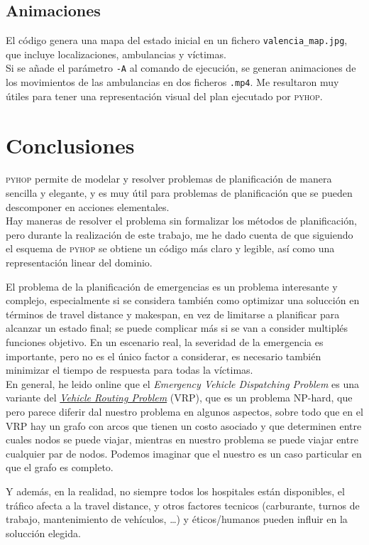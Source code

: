 \subsection{Animaciones}

El código genera una mapa del estado inicial en un fichero \texttt{valencia\_map.jpg}, que incluye localizaciones, ambulancias y víctimas.\\
Si se añade el parámetro \texttt{-A} al comando de ejecución, se generan animaciones de los movimientos de las ambulancias en dos ficheros \texttt{.mp4}.
Me resultaron muy útiles para tener una representación visual del plan ejecutado por \textsc{pyhop}.


\section{Conclusiones}

\textsc{pyhop} permite de modelar y resolver problemas de planificación de manera sencilla y elegante, y es muy útil para problemas de planificación que se pueden descomponer en acciones elementales.\\
Hay maneras de resolver el problema sin formalizar los métodos de planificación, pero durante la realización de este trabajo, me he dado cuenta de que siguiendo el esquema de \textsc{pyhop} se obtiene un código más claro y legible, así como una representación linear del dominio.

El problema de la planificación de emergencias es un problema interesante y complejo, especialmente si se considera también como optimizar una solucción en términos de travel distance y makespan, en vez de limitarse a planificar para alcanzar un estado final; se puede complicar más si se van a consider multiplés funciones objetivo.
En un escenario real, la severidad de la emergencia es importante, pero no es el único factor a considerar, es necesario también minimizar el tiempo de respuesta para todas la víctimas.\\
En general, he leido online que el \textit{Emergency Vehicle Dispatching Problem} es una variante del \href{https://en.wikipedia.org/wiki/Vehicle_routing_problem}{\textit{Vehicle Routing Problem}} (VRP), que es un problema NP-hard, que pero parece diferir dal nuestro problema en algunos aspectos, sobre todo que en el VRP hay un grafo con arcos que tienen un costo asociado y que determinen entre cuales nodos se puede viajar, mientras en nuestro problema se puede viajar entre cualquier par de nodos. Podemos imaginar que el nuestro es un caso particular en que el grafo es completo.

Y además, en la realidad, no siempre todos los hospitales están disponibles, el tráfico afecta a la travel distance, y otros factores tecnicos (carburante, turnos de trabajo, mantenimiento de vehículos, \dots) y éticos/humanos pueden influir en la solucción elegida.

